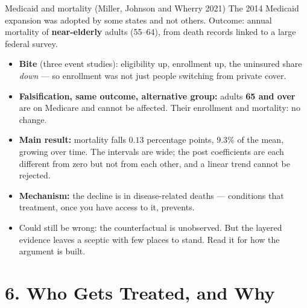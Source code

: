 \documentclass[
  11pt,
  ignorenonframetext,
  aspectratio=169,
]{beamer}
\providecommand{\tightlist}{%
  \setlength{\itemsep}{0pt}\setlength{\parskip}{0pt}}
\begin{document}
\begin{frame}{Medicaid and mortality (Miller, Johnson and Wherry 2021)}
\protect{}\label{medicaid-and-mortality-miller-johnson-and-wherry-2021}
The 2014 Medicaid expansion was adopted by some states and not others.
Outcome: annual mortality of \textbf{near-elderly} adults (55--64), from
death records linked to a large federal survey.

\begin{itemize}
\tightlist
\item
  \textbf{Bite} (three event studies): eligibility up, enrollment up,
  the uninsured share \emph{down} --- so enrollment was not just people
  switching from private cover.
\item
  \textbf{Falsification, same outcome, alternative group:} adults
  \textbf{65 and over} are on Medicare and cannot be affected. Their
  enrollment and mortality: no change.
\item
  \textbf{Main result:} mortality falls \(0.13\) percentage points,
  \(9.3\%\) of the mean, growing over time. The intervals are wide; the
  post coefficients are each different from zero but not from each
  other, and a linear trend cannot be rejected.
\item
  \textbf{Mechanism:} the decline is in disease-related deaths ---
  conditions that treatment, once you have access to it, prevents.
\end{itemize}

\vspace{0.2em}

\begin{itemize}
\tightlist
\item
  Could still be wrong: the counterfactual is unobserved. But the
  layered evidence leaves a sceptic with few places to stand. Read it
  for how the argument is built.
\end{itemize}
\end{frame}

\section{6. Who Gets Treated, and Why}\label{who-gets-treated-and-why}
\end{document}
